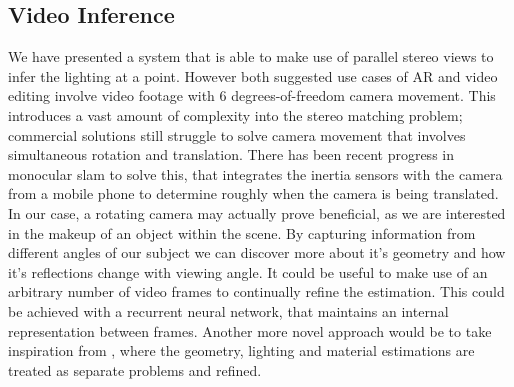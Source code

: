 \documentclass[ %
                    author={Gavin Parker},
                supervisor={Dr. Neill Campbell},
                    degree={MEng},
                     title={Deep Siamese Networks for Illumination Estimation from Stereo Images},
                  subtitle={},
                      type={Research},
                      year={2018} ]{dissertation}
\begin{document}
\subsection{Video Inference}
We have presented a system that is able to make use of parallel stereo views to infer the lighting at a point. However both suggested use cases of AR and video editing involve video footage with 6 degrees-of-freedom camera movement. This introduces a vast amount of complexity into the stereo matching problem; commercial solutions still struggle to solve camera movement that involves simultaneous rotation and translation. There has been recent progress in monocular slam to solve this, that integrates the inertia sensors with the camera from a mobile phone to determine roughly when the camera is being translated. In our case, a rotating camera may actually prove beneficial, as we are interested in the makeup of an object within the scene. By capturing information from different angles of our subject we can discover more about it's geometry and how it's reflections change with viewing angle. It could be useful to make use of an arbitrary number of video frames to continually refine the estimation. This could be achieved with a recurrent neural network, that maintains an internal representation between frames. \newline
Another more novel approach would be to take inspiration from \cite{xia}, where the geometry, lighting and material estimations are treated as separate problems and refined.
 
\end{document}

